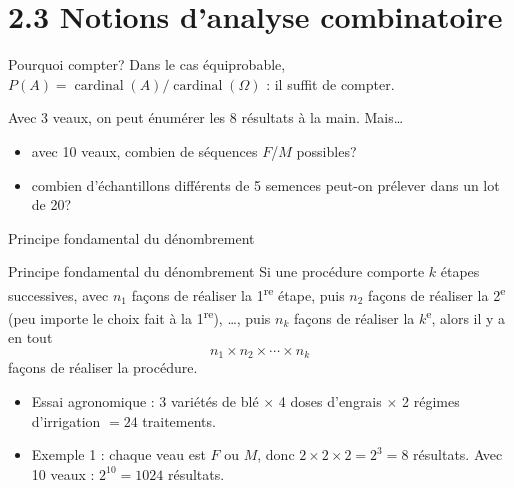 \documentclass{BeamerTemplate}
\begin{document}
\section[Analyse combinatoire]{2.3 Notions d'analyse combinatoire}

\begin{frame}[t]{Pourquoi compter?}
  Dans le \alert{cas équiprobable},
  $P(A) = \operatorname{cardinal}(A) / \operatorname{cardinal}(\Omega)$ :
  il suffit de \alert{compter}.

  \medskip
  Avec 3 veaux, on peut énumérer les 8 résultats à la main. Mais\ldots
  \begin{itemize}\itemsep 2mm
    \item avec 10 veaux, combien de séquences $F$/$M$ possibles?
    \item combien d'échantillons différents de 5 semences peut-on prélever
      dans un lot de 20?
  \end{itemize}

  \medskip
\end{frame}

\begin{frame}[t]{Principe fondamental du dénombrement}
  \begin{Boite}{Principe fondamental du dénombrement}
    Si une procédure comporte $k$ étapes successives, avec $n_1$ façons de
    réaliser la 1\textsuperscript{re} étape, puis $n_2$ façons de réaliser la
    2\textsuperscript{e} (peu importe le choix fait à la 1\textsuperscript{re}),
    \ldots, puis $n_k$ façons de réaliser la $k$\textsuperscript{e}, alors il y
    a en tout
    \[ n_1 \times n_2 \times \cdots \times n_k \]
    façons de réaliser la procédure.
  \end{Boite}

  \begin{itemize}\itemsep 1mm
    \item<2-> Essai agronomique : 3 variétés de blé $\times$ 4 doses d'engrais
      $\times$ 2 régimes d'irrigation $= 24$ traitements.
    \item<3-> Exemple 1 : chaque veau est $F$ ou $M$, donc
      $2 \times 2 \times 2 = 2^3 = 8$ résultats. Avec 10 veaux :
      $2^{10} = 1024$ résultats.
  \end{itemize}
\end{frame}
\end{document}
